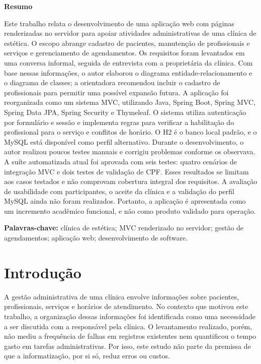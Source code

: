 \documentclass[12pt,a4paper]{article}
\begin{document}
\begin{center}\textbf{Resumo}\end{center}
Este trabalho relata o desenvolvimento de uma aplicação web com páginas renderizadas no servidor para apoiar atividades administrativas de uma clínica de estética. O escopo abrange cadastro de pacientes, manutenção de profissionais e serviços e gerenciamento de agendamentos. Os requisitos foram levantados em uma conversa informal, seguida de entrevista com a proprietária da clínica. Com base nessas informações, o autor elaborou o diagrama entidade-relacionamento e o diagrama de classes; a orientadora recomendou incluir o cadastro de profissionais para permitir uma possível expansão futura. A aplicação foi reorganizada como um sistema MVC, utilizando Java, Spring Boot, Spring MVC, Spring Data JPA, Spring Security e Thymeleaf. O sistema utiliza autenticação por formulário e sessão e implementa regras para verificar a habilitação do profissional para o serviço e conflitos de horário. O H2 é o banco local padrão, e o MySQL está disponível como perfil alternativo. Durante o desenvolvimento, o autor realizou poucos testes manuais e corrigiu problemas conforme os observava. A suíte automatizada atual foi aprovada com seis testes: quatro cenários de integração MVC e dois testes de validação de CPF. Esses resultados se limitam aos casos testados e não comprovam cobertura integral dos requisitos. A avaliação de usabilidade com participantes, o aceite da clínica e a validação do perfil MySQL ainda não foram realizados. Portanto, a aplicação é apresentada como um incremento acadêmico funcional, e não como produto validado para operação.\par
\noindent\textbf{Palavras-chave:} clínica de estética; MVC renderizado no servidor; gestão de agendamentos; aplicação web; desenvolvimento de software.

\section{Introdução}

A gestão administrativa de uma clínica envolve informações sobre pacientes, profissionais, serviços e horários de atendimento. No contexto que motivou este trabalho, a organização dessas informações foi identificada como uma necessidade a ser discutida com a responsável pela clínica. O levantamento realizado, porém, não mediu a frequência de falhas em registros existentes nem quantificou o tempo gasto em tarefas administrativas. Por isso, este estudo não parte da premissa de que a informatização, por si só, reduz erros ou custos.
\end{document}
